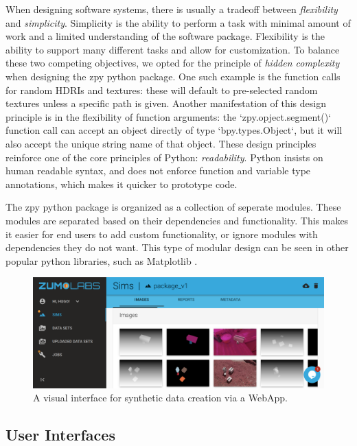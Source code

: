 \documentclass{article}
\begin{document}
When designing software systems, there is usually a tradeoff between \emph{flexibility} and \emph{simplicity}. Simplicity is the ability to perform a task with minimal amount of work and a limited understanding of the software package. Flexibility is the ability to support many different tasks and allow for customization. To balance these two competing objectives, we opted for the principle of \emph{hidden complexity} when designing the zpy python package. One such example is the function calls for random HDRIs and textures: these will default to pre-selected random textures unless a specific path is given. Another manifestation of this design principle is in the flexibility of function arguments: the `zpy.opject.segment()` function call can accept an object directly of type `bpy.types.Object`, but it will also accept the unique string name of that object. These design principles reinforce one of the core principles of Python: \emph{readability}. Python insists on human readable syntax, and does not enforce function and variable type annotations, which makes it quicker to prototype code.


The zpy python package is organized as a collection of seperate modules. These modules are separated based on their dependencies and functionality. This makes it easier for end users to add custom functionality, or ignore modules with dependencies they do not want. This type of modular design can be seen in other popular python libraries, such as Matplotlib \cite{Hunter:2007}.

\begin{figure}
	\centering
	\includegraphics[width=\textwidth]{webapp.png}
	\caption{A visual interface for synthetic data creation via a WebApp.}
	\label{fig:webapp}
\end{figure}

\subsection{User Interfaces}
\label{sec:userinterfaces}
\end{document}
